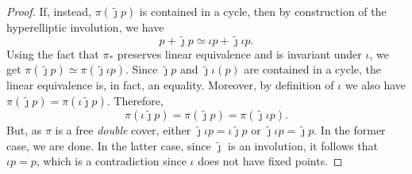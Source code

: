 \documentclass[11pt]{article}
\theoremstyle{definition}
\numberwithin{equation}{section}
\theoremstyle{definition}
\newcommand{\tj}{\widetilde{\jmath}}
\begin{document}
\begin{proof}
        
        If, instead, $\pi(\widetilde{\jmath}p)$ is contained in a cycle, then by construction of the hyperelliptic involution, we have
        \begin{equation}\label{c}
             p+\widetilde{\jmath}p\simeq \iota p+\tj\iota p.
        \end{equation}  
        Using the fact that $\pi_*$ preserves linear equivalence and is invariant under $\iota$, we get
        $\pi(\widetilde{\jmath}p)\simeq \pi(\widetilde{\jmath}\iota p).
        $
        Since $\tj p$ and $\tj\iota(p)$
        are contained in a cycle, the linear equivalence is, in fact, an equality. Moreover, by definition of $\iota$ we also have 
        $\pi(\widetilde{\jmath}p)=\pi(\iota \tj p)$. Therefore,
        \[
\pi(\iota\widetilde{\jmath}p)=\pi(\widetilde{\jmath}p)=\pi(\widetilde{\jmath}\iota p).
        \]
But, as $\pi$ is a free \emph{double} cover,  either $\tj\iota p=\iota \tj p$ or $\tj\iota p=\tj p$. In the former case, we are done. In the latter case, since $\tj$ is an involution, it follows that $\iota p = p$, which is a contradiction since $\iota$ does not have fixed points. 
    \end{proof}
\end{document}
